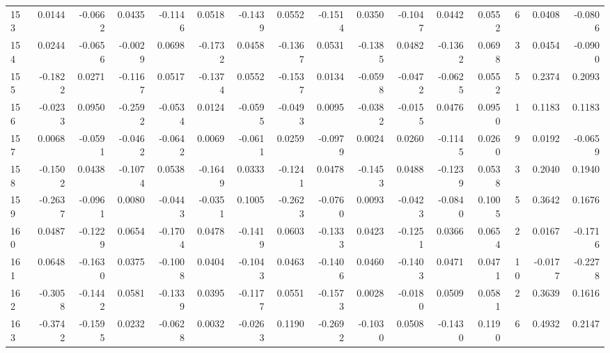 \begin{tabular}{lrrrrrrrrrrrrrrr}
153 &      0.0144 & -0.0662 &  0.0435 & -0.1146 &  0.0518 & -0.1439 &  0.0552 & -0.1514 &  0.0350 & -0.1047 &   0.0442 &     0.0552 &      6 &                    0.0408 &                    -0.0806 \\
154 &      0.0244 & -0.0656 & -0.0029 &  0.0698 & -0.1732 &  0.0458 & -0.1367 &  0.0531 & -0.1385 &  0.0482 &  -0.1362 &     0.0698 &      3 &                    0.0454 &                    -0.0900 \\
155 &     -0.1822 &  0.0271 & -0.1167 &  0.0517 & -0.1374 &  0.0552 & -0.1537 &  0.0134 & -0.0598 & -0.0472 &  -0.0625 &     0.0552 &      5 &                    0.2374 &                     0.2093 \\
156 &     -0.0233 &  0.0950 & -0.2592 & -0.0534 &  0.0124 & -0.0595 & -0.0493 &  0.0095 & -0.0382 & -0.0155 &   0.0476 &     0.0950 &      1 &                    0.1183 &                     0.1183 \\
157 &      0.0068 & -0.0591 & -0.0462 & -0.0642 &  0.0069 & -0.0611 &  0.0259 & -0.0979 &  0.0024 &  0.0260 &  -0.1145 &     0.0260 &      9 &                    0.0192 &                    -0.0659 \\
158 &     -0.1502 &  0.0438 & -0.1074 &  0.0538 & -0.1649 &  0.0333 & -0.1241 &  0.0478 & -0.1453 &  0.0488 &  -0.1239 &     0.0538 &      3 &                    0.2040 &                     0.1940 \\
159 &     -0.2637 & -0.0961 &  0.0080 & -0.0443 & -0.0351 &  0.1005 & -0.2623 & -0.0760 &  0.0093 & -0.0423 &  -0.0840 &     0.1005 &      5 &                    0.3642 &                     0.1676 \\
160 &      0.0487 & -0.1229 &  0.0654 & -0.1704 &  0.0478 & -0.1419 &  0.0603 & -0.1333 &  0.0423 & -0.1251 &   0.0366 &     0.0654 &      2 &                    0.0167 &                    -0.1716 \\
161 &      0.0648 & -0.1630 &  0.0375 & -0.1008 &  0.0404 & -0.1043 &  0.0463 & -0.1406 &  0.0460 & -0.1403 &   0.0471 &     0.0471 &     10 &                   -0.0177 &                    -0.2278 \\
162 &     -0.3058 & -0.1442 &  0.0581 & -0.1339 &  0.0395 & -0.1177 &  0.0551 & -0.1573 &  0.0028 & -0.0180 &   0.0509 &     0.0581 &      2 &                    0.3639 &                     0.1616 \\
163 &     -0.3742 & -0.1595 &  0.0232 & -0.0628 &  0.0032 & -0.0263 &  0.1190 & -0.2692 & -0.1030 &  0.0508 &  -0.1430 &     0.1190 &      6 &                    0.4932 &                     0.2147 \\

\end{tabular}
